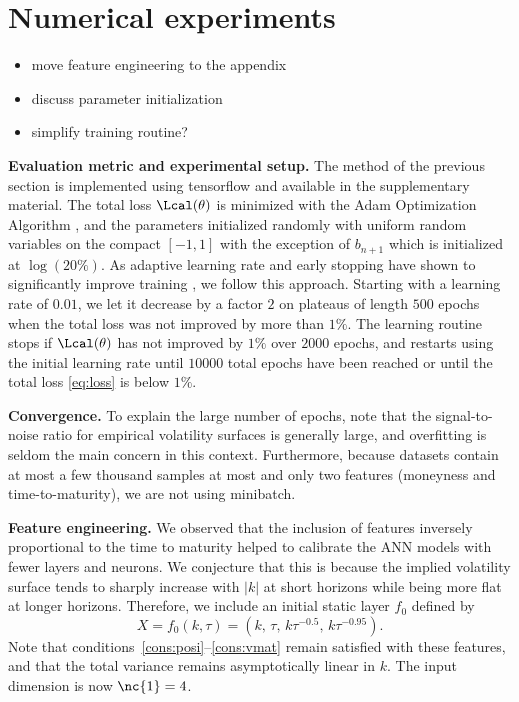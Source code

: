 \section{Numerical experiments} \label{sec:num}

\begin{itemize}
\item move feature engineering to the appendix
\item discuss parameter initialization
\item simplify training routine?
\end{itemize}

\textbf{Evaluation metric and experimental setup.} 
The method of the previous section is implemented using tensorflow \cite{abadi2016tensorflow} and available in the supplementary material.
The total loss $\Lcal(\theta)$ is minimized with the Adam Optimization Algorithm \citep{kingma2014adam}, and the parameters initialized randomly with uniform random variables on the compact $[-1, 1]$ with the exception of $b_{n+1}$ which is initialized at $\log(20\%)$.
As adaptive learning rate and early stopping have shown to significantly improve training \citep{haykin2009neural, hagan1994training, sutskever2013importance, caruana2001overfitting, prechelt1998early, hinton2015distilling}, we follow this approach.
Starting with a learning rate of $0.01$, we let it decrease by a factor $2$ on plateaus of length $500$ epochs when the total loss was not improved by more than $1\%$.
The learning routine stops if $\Lcal(\theta)$ has not improved by $1\%$ over $2000$ epochs, and restarts using the initial learning rate until $10000$ total epochs have been reached or until the total loss \eqref{eq:loss} is below $1\%$.

\textbf{Convergence.}
To explain the large number of epochs, note that the signal-to-noise ratio for empirical volatility surfaces is generally large, and overfitting is seldom the main concern in this context.
Furthermore, because datasets contain at most a few thousand samples at most and only two features (moneyness and time-to-maturity), we are not using minibatch.

\textbf{Feature engineering.} We observed that the inclusion of features inversely proportional to the time to maturity helped to calibrate the ANN models with fewer layers and neurons.
We conjecture that this is because the implied volatility surface tends to sharply increase with $\lvert k \rvert$ at short horizons while being more flat at longer horizons.
Therefore, we include an initial static layer $f_0$ defined by
\begin{equation}\label{eq:feateng}
X = f_0(k,\tau) = \left(k, \, \tau, \, k \tau^{-0.5}, \, k \tau^{-0.95} \right).
\end{equation}
Note that conditions~\ref{cons:posi}--\ref{cons:vmat} remain satisfied with these features, and that the total variance remains asymptotically linear in $k$. 
The input dimension is now $\nc{1}=4$.

